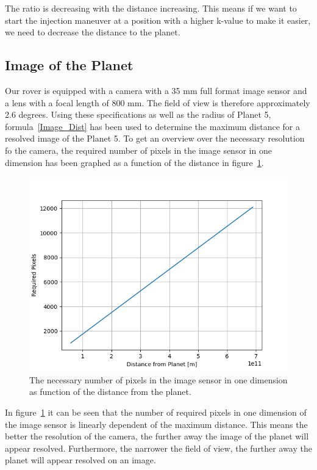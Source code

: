 \documentclass[reprint,english,notitlepage]{revtex4-2}
\begin{document}
	The ratio is decreasing with the distance increasing.
	This means if we want to start the injection maneuver at a position with a higher k-value to make it easier, we need to decrease the distance to the planet.


\subsection{Image of the Planet}\label{subsec:image-of-the-planet}
	Our rover is equipped with a camera with a 35 mm full format image sensor and a lens with a focal length of 800 mm.
	The field of view is therefore approximately 2.6 degrees.
	Using these specifications as well as the radius of Planet 5, formula~\eqref{Image_Dist} has been used to determine the maximum distance for a resolved image of the Planet 5.
	To get an overview over the necessary resolution fo the camera, the required number of pixels in the image sensor in one dimension has been graphed as a function of the distance in figure~\ref{fig:Res_pixels}.

	\begin{figure}[h]
		\centering
		\includegraphics[scale=0.4]{Figures/Res_pixels}
		\caption{The necessary number of pixels in the image sensor in one dimension as function of the distance from the planet.}\label{fig:Res_pixels}
	\end{figure}

	In figure~\ref{fig:Res_pixels} it can be seen that the number of required pixels in one dimension of the image sensor is linearly dependent of the maximum distance.
	This means the better the resolution of the camera, the further away the image of the planet will appear resolved.
	Furthermore, the narrower the field of view, the further away the planet will appear resolved on an image.
\end{document}
